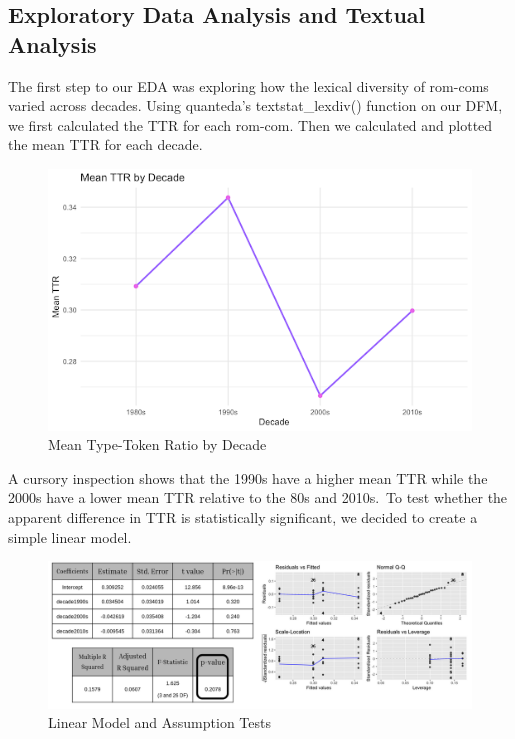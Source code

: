 \documentclass[
  authoryear,
  preprint]{elsarticle}
\begin{document}
\subsection{Exploratory Data Analysis and Textual
Analysis}\label{exploratory-data-analysis-and-textual-analysis}

The first step to our EDA was exploring how the lexical diversity of
rom-coms varied across decades. Using quanteda's textstat\_lexdiv()
function on our DFM, we first calculated the TTR for each rom-com. Then
we calculated and plotted the mean TTR for each decade.

\begin{figure}[H]

{\centering \includegraphics{images/mean_ttr.png}

}

\caption{Mean Type-Token Ratio by Decade}

\end{figure}%

A cursory inspection shows that the 1990s have a higher mean TTR while
the 2000s have a lower mean TTR relative to the 80s and 2010s.~To test
whether the apparent difference in TTR is statistically significant, we
decided to create a simple linear model.

\begin{figure}[H]

{\centering \includegraphics{images/Screenshot 2025-03-21 at 16-45-10 STATS 133 Are Romcoms Dead - Google Slides.png}

}

\caption{Linear Model and Assumption Tests}

\end{figure}%
\end{document}
